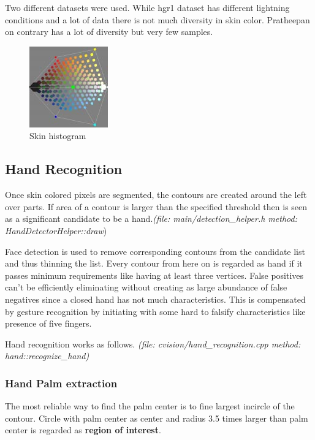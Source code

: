 \documentclass[11pt,a4paper]{article}
\begin{document}
Two different datasets were used. While hgr1\citep{Kawulok2014EURASIP}\citep{Grzejszczak2016MTA} dataset has different lightning conditions and a lot of data there is not much diversity in skin color. Pratheepan\citep{Praptheepan} on contrary has a lot of diversity but very few samples.

\begin{figure}
\begin{center}
\includegraphics{histogram}
\end{center}
\caption{Skin histogram~\citet{Jones2002}}
\label{fig:histogram}
\end{figure}

\subsection{Hand Recognition}
Once skin colored pixels are segmented, the contours are created around the left over parts. If area of a contour is larger than the specified threshold then is seen as a significant candidate to be a hand.\textit{(file: main/detection\_helper.h method: HandDetectorHelper::draw})\bigskip

Face detection is used to remove corresponding contours from the candidate list and thus thinning the list. Every contour from here on is regarded as hand if it passes minimum requirements like having at least three vertices. False positives can't be efficiently eliminating without creating as large abundance of false negatives since a closed hand has not much characteristics. This is compensated by gesture recognition by initiating with some hard to falsify characteristics like presence of five fingers.\bigskip

Hand recognition works as follows.
\textit{(file: cvision/hand\_recognition.cpp method: hand::recognize\_hand)}

\subsubsection{Hand Palm extraction} 
The most reliable way to find the palm center is to fine largest incircle of the contour. Circle with palm center as center and radius 3.5 times larger than palm center is regarded as \textbf{region of interest}.\citet{Yeo2015}\bigskip
\end{document}
